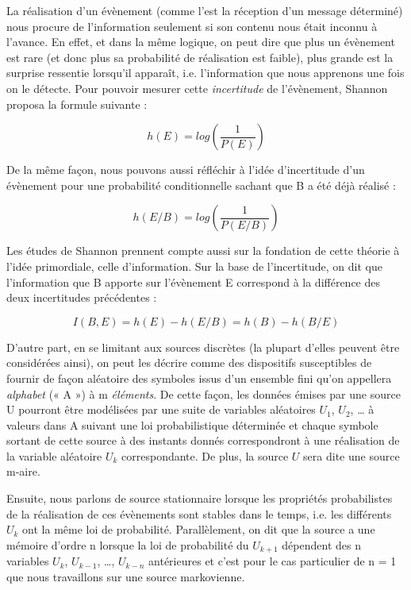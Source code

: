 \documentclass[a4paper,12pt,french]{article}
\begin{document}
    La réalisation d’un évènement (comme l’est la réception d’un message déterminé) nous procure de l’information seulement si son contenu nous était inconnu à l’avance. En effet, et dans la même logique, on peut dire que plus un évènement est rare (et donc plus sa probabilité de réalisation est faible), plus grande est la surprise ressentie lorsqu’il apparaît, i.e. l’information que nous apprenons une fois on le détecte. Pour pouvoir mesurer cette \textit{incertitude} de l’évènement, Shannon proposa la formule suivante :

	\begin{equation}
	    h(E) = log(\frac{1}{P(E)})
	\end{equation}
	
	De la même façon, nous pouvons aussi réfléchir à l’idée d’incertitude d’un évènement pour une probabilité conditionnelle sachant que B a été déjà réalisé :
	
	\begin{equation}
	    h(E/B) = log(\frac{1}{P(E/B)})
	\end{equation}
	
	Les études de Shannon prennent compte aussi sur la fondation de cette théorie à l’idée primordiale, celle d’information. Sur la base de l’incertitude, on dit que l’information que B apporte sur l’évènement E correspond à la différence des deux incertitudes précédentes :
	
	\begin{equation}
	    I(B,E) = h(E) - h(E/B) = h(B) - h(B/E)
	\end{equation}
	
	D’autre part, en se limitant aux sources discrètes (la plupart d’elles peuvent être considérées ainsi), on peut les décrire comme des dispositifs susceptibles de fournir de façon aléatoire des symboles issus d’un ensemble fini qu’on appellera \textit{alphabet} (« A ») à m \textit{éléments}. De cette façon, les données émises par une source U pourront être modélisées par une suite de variables aléatoires $U_{1}$, $U_{2}$, … à valeurs dans A suivant une loi probabilistique déterminée et chaque symbole sortant de cette source à des instants donnés correspondront à une réalisation de la variable aléatoire $U_{k}$ correspondante. De plus, la source $U$ sera dite une source m-aire.
    
    Ensuite, nous parlons de source stationnaire lorsque les propriétés probabilistes de la réalisation de ces évènements sont stables dans le temps, i.e. les différents $U_{k}$ ont la même loi de probabilité. Parallèlement, on dit que la source a une mémoire d’ordre n lorsque la loi de probabilité du $U_{k+1}$ dépendent des n variables $U_{k}$, $U_{k-1}$, …, $U_{k-n}$ antérieures et c’est pour le cas particulier de n = 1 que nous travaillons sur une source markovienne.
    
\end{document}
